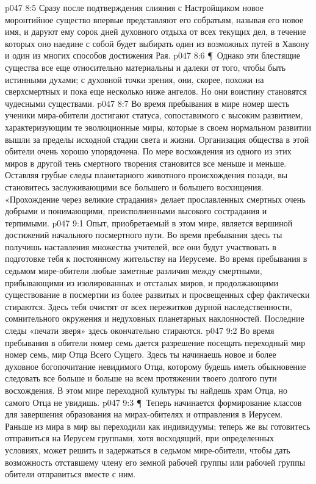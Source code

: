 \vs p047 8:5 Сразу после подтверждения слияния с Настройщиком новое моронтийное существо впервые представляют его собратьям, называя его новое имя, и даруют ему сорок дней духовного отдыха от всех текущих дел, в течение которых оно наедине с собой будет выбирать один из возможных путей в Хавону и один из многих способов достижения Рая.
\vs p047 8:6 \P\ Однако эти блестящие существа все еще относительно материальны и далеки от того, чтобы быть истинными духами; с духовной точки зрения, они, скорее, похожи на сверхсмертных и пока еще несколько ниже ангелов. Но они воистину становятся чудесными существами.
\vs p047 8:7 Во время пребывания в мире номер шесть ученики мира\hyp{}обители достигают статуса, сопоставимого с высоким развитием, характеризующим те эволюционные миры, которые в своем нормальном развитии вышли за пределы исходной стадии света и жизни. Организация общества в этой обители очень хорошо упорядочена. По мере восхождения из одного из этих миров в другой тень смертного творения становится все меньше и меньше. Оставляя грубые следы планетарного животного происхождения позади, вы становитесь заслуживающими все большего и большего восхищения. «Прохождение через великие страдания» делает прославленных смертных очень добрыми и понимающими, преисполненными высокого сострадания и терпимыми.
\vs p047 9:1 Опыт, приобретаемый в этом мире, является вершиной достижений начального посмертного пути. Во время пребывания здесь ты получишь наставления множества учителей, все они будут участвовать в подготовке тебя к постоянному жительству на Иерусеме. Во время пребывания в седьмом мире\hyp{}обители любые заметные различия между смертными, прибывающими из изолированных и отсталых миров, и продолжающими существование в посмертии из более развитых и просвещенных сфер фактически стираются. Здесь тебя очистят от всех пережитков дурной наследственности, сомнительного окружения и недуховных планетарных наклонностей. Последние следы «печати зверя» здесь окончательно стираются.
\vs p047 9:2 Во время пребывания в обители номер семь дается разрешение посещать переходный мир номер семь, мир Отца Всего Сущего. Здесь ты начинаешь новое и более духовное богопочитание невидимого Отца, которому будешь иметь обыкновение следовать все больше и больше на всем протяжении твоего долгого пути восхождения. В этом мире переходной культуры ты найдешь храм Отца, но самого Отца не увидишь.
\vs p047 9:3 \P\ Теперь начинается формирование классов для завершения образования на мирах\hyp{}обителях и отправления в Иерусем. Раньше из мира в мир вы переходили как индивидуумы; теперь же вы готовитесь отправиться на Иерусем группами, хотя восходящий, при определенных условиях, может решить и задержаться в седьмом мире\hyp{}обители, чтобы дать возможность отставшему члену его земной рабочей группы или рабочей группы обители отправиться вместе с ним.

